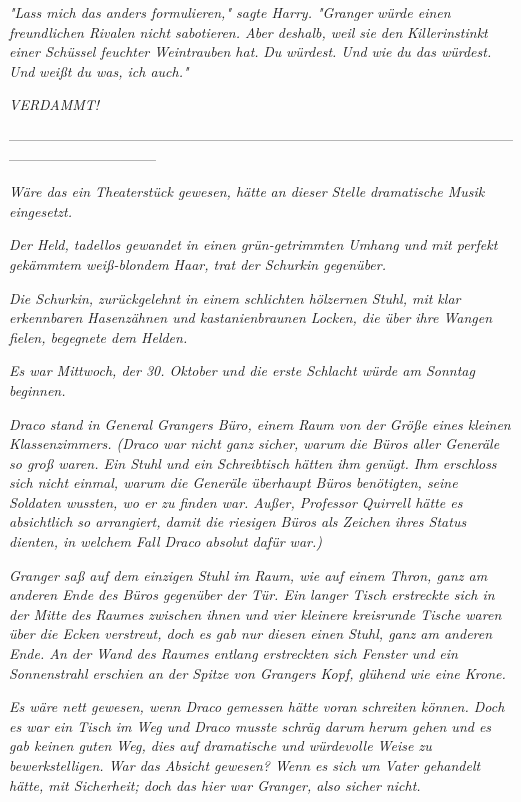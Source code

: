 {\emph{"Lass mich das anders formulieren," sagte Harry. "\emph{Granger}} \emph{würde einen freundlichen Rivalen nicht sabotieren. Aber deshalb, weil sie den} \emph{Killerinstinkt einer Schüssel feuchter Weintrauben hat.} \emph{\emph{Du}} \emph{würdest. Und} \emph{\emph{wie}} \emph{du das würdest. Und} \emph{weißt du was, ich auch."}

\emph{\emph{VERDAMMT!}}

--------------------------------------------------------------------------------------------------------------------------------------------

\emph{Wäre das ein Theaterstück gewesen, hätte} \emph{an dieser Stelle} \emph{dramatische Musik eingesetzt.}

\emph{Der Held, tadellos gewandet in einen grün-getrimmten Umhang und mit perfekt gekämmtem weiß-blondem Haar, trat der Schurkin gegenüber.}

\emph{Die Schurkin, zurückgelehnt in einem schlichten hölzernen Stuhl, mit klar erkennbaren Hasenzähnen und kastanienbraunen Locken, die über ihre Wangen fielen, begegnete dem Helden.}

\emph{Es war Mittwoch, der 30. Oktober und die erste Schlacht würde am Sonntag beginnen.}

\emph{Draco stand in General Grangers Büro, einem Raum von der Größe eines kleinen Klassenzimmers. (Draco war nicht ganz sicher,} \emph{\emph{warum}} \emph{die Büros aller Generäle so groß waren. Ein Stuhl und ein Schreibtisch hätten ihm genügt. Ihm erschloss sich nicht einmal, warum die Generäle überhaupt Büros benötigten, seine Soldaten wussten, wo er zu finden war. Außer, Professor Quirrell hätte es absichtlich so arrangiert, damit die riesigen Büros als Zeichen ihres Status dienten, in welchem Fall Draco absolut dafür war.)}

\emph{Granger saß auf dem einzigen Stuhl im Raum, wie auf einem Thron, ganz am anderen Ende des Büros gegenüber der Tür. Ein langer Tisch erstreckte sich in der Mitte des Raumes zwischen ihnen und vier kleinere kreisrunde Tische waren über die Ecken verstreut, doch es gab nur diesen einen Stuhl, ganz am anderen Ende. An der Wand des Raumes entlang erstreckten sich Fenster und ein Sonnenstrahl erschien an der Spitze von Grangers Kopf, glühend wie eine Krone.}

\emph{Es wäre nett gewesen, wenn Draco gemessen hätte voran schreiten können. Doch es war ein Tisch im Weg und Draco musste schräg darum} \emph{herum gehen und es gab keinen guten Weg, dies auf dramatische und würdevolle Weise zu bewerkstelligen. War das Absicht gewesen? Wenn es sich um Vater gehandelt hätte, mit Sicherheit; doch das hier war Granger, also sicher nicht.}

}
